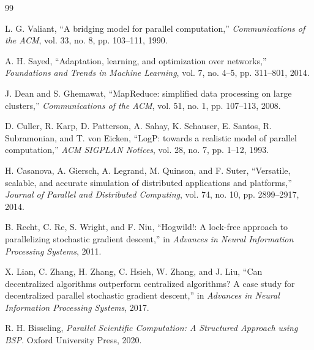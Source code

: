﻿\documentclass[10pt,journal]{IEEEtran}
\begin{document}
	\begin{thebibliography}{99}
		
		L. G. Valiant, ``A bridging model for parallel computation,'' \emph{Communications of the ACM}, vol. 33, no. 8, pp. 103--111, 1990.
		
		A. H. Sayed, ``Adaptation, learning, and optimization over networks,'' \emph{Foundations and Trends in Machine Learning}, vol. 7, no. 4--5, pp. 311--801, 2014.
		
		J. Dean and S. Ghemawat, ``MapReduce: simplified data processing on large clusters,'' \emph{Communications of the ACM}, vol. 51, no. 1, pp. 107--113, 2008.
		
		D. Culler, R. Karp, D. Patterson, A. Sahay, K. Schauser, E. Santos, R. Subramonian, and T. von Eicken, ``LogP: towards a realistic model of parallel computation,'' \emph{ACM SIGPLAN Notices}, vol. 28, no. 7, pp. 1--12, 1993.
		
		H. Casanova, A. Giersch, A. Legrand, M. Quinson, and F. Suter, ``Versatile, scalable, and accurate simulation of distributed applications and platforms,'' \emph{Journal of Parallel and Distributed Computing}, vol. 74, no. 10, pp. 2899--2917, 2014.
		
		B. Recht, C. Re, S. Wright, and F. Niu, ``Hogwild!: A lock-free approach to parallelizing stochastic gradient descent,'' in \emph{Advances in Neural Information Processing Systems}, 2011.
		
		X. Lian, C. Zhang, H. Zhang, C. Hsieh, W. Zhang, and J. Liu, ``Can decentralized algorithms outperform centralized algorithms? A case study for decentralized parallel stochastic gradient descent,'' in \emph{Advances in Neural Information Processing Systems}, 2017.
		
		R. H. Bisseling, \emph{Parallel Scientific Computation: A Structured Approach using BSP}. Oxford University Press, 2020.
		
	\end{thebibliography}
	
\end{document}
